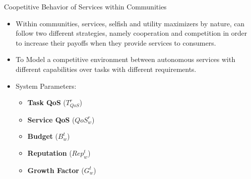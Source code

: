 \documentclass{beamer}
\begin{document}
\begin{frame}{Coopetitive Behavior of Services within Communities}
    \begin{itemize}
        \item Within communities, services, selfish and utility maximizers by nature, can follow two different strategies, namely cooperation and competition in order to increase their payoffs when they provide services to consumers.
        \item To Model a competitive environment between autonomous services with different capabilities over tasks with different requirements.
        \item System Parameters:
        \begin{itemize}
            \item \textbf{Task QoS} ($T_{QoS}^r$)
            \item \textbf{Service QoS} ($QoS_w^r$)
            \item \textbf{Budget} ($B_w^t$)
            \item \textbf{Reputation} ($Rep_w^t$)
            \item \textbf{Growth Factor} ($G_w^t$)
        \end{itemize}
    \end{itemize}
\end{frame}
\end{document}
